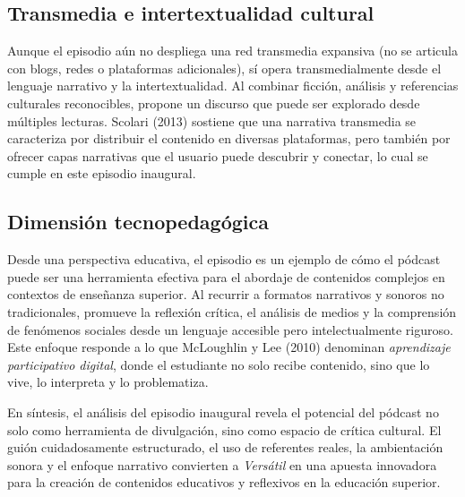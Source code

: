 \documentclass[
]{interact}
\begin{document}
\subsection{Transmedia e intertextualidad
cultural}\label{transmedia-e-intertextualidad-cultural}

Aunque el episodio aún no despliega una red transmedia expansiva (no se
articula con blogs, redes o plataformas adicionales), sí opera
transmedialmente desde el lenguaje narrativo y la intertextualidad. Al
combinar ficción, análisis y referencias culturales reconocibles,
propone un discurso que puede ser explorado desde múltiples lecturas.
Scolari (2013) sostiene que una narrativa transmedia se caracteriza por
distribuir el contenido en diversas plataformas, pero también por
ofrecer capas narrativas que el usuario puede descubrir y conectar, lo
cual se cumple en este episodio inaugural.

\subsection{Dimensión
tecnopedagógica}\label{dimensiuxf3n-tecnopedaguxf3gica}

Desde una perspectiva educativa, el episodio es un ejemplo de cómo el
pódcast puede ser una herramienta efectiva para el abordaje de
contenidos complejos en contextos de enseñanza superior. Al recurrir a
formatos narrativos y sonoros no tradicionales, promueve la reflexión
crítica, el análisis de medios y la comprensión de fenómenos sociales
desde un lenguaje accesible pero intelectualmente riguroso. Este enfoque
responde a lo que McLoughlin y Lee (2010) denominan \emph{aprendizaje
participativo digital}, donde el estudiante no solo recibe contenido,
sino que lo vive, lo interpreta y lo problematiza.

En síntesis, el análisis del episodio inaugural revela el potencial del
pódcast no solo como herramienta de divulgación, sino como espacio de
crítica cultural. El guión cuidadosamente estructurado, el uso de
referentes reales, la ambientación sonora y el enfoque narrativo
convierten a \emph{Versátil} en una apuesta innovadora para la creación
de contenidos educativos y reflexivos en la educación superior.

\newpage
\end{document}
